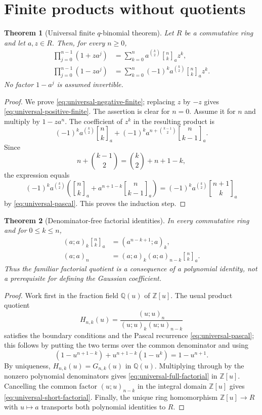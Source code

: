 \documentclass[11pt,oneside,openany]{book}
\newtheorem{theorem}{Theorem}[chapter]
\theoremstyle{definition}
\theoremstyle{remark}
\newcommand{\Qbinom}[3]{\genfrac{[}{]}{0pt}{}{#1}{#2}_{#3}}
\newcommand{\Q}{\mathbb Q}
\newcommand{\Z}{\mathbb Z}
\begin{document}
\section{Finite products without quotients}

\begin{theorem}[Universal finite $q$-binomial theorem]\label{thm:universal-finite-qbinomial}
Let $R$ be a commutative ring and let $a,z\in R$.  Then, for every $n\ge0$,
\begin{align}
 \prod_{j=0}^{n-1}(1+za^j)
 &=\sum_{k=0}^n a^{\binom{k}{2}}\Qbinom nk a z^k,\label{eq:universal-positive-finite}\\
 \prod_{j=0}^{n-1}(1-za^j)
 &=\sum_{k=0}^n(-1)^ka^{\binom{k}{2}}\Qbinom nk a z^k.\label{eq:universal-negative-finite}
\end{align}
No factor $1-a^j$ is assumed invertible.
\end{theorem}

\begin{proof}
We prove \eqref{eq:universal-negative-finite}; replacing $z$ by $-z$ gives \eqref{eq:universal-positive-finite}.  The assertion is clear for $n=0$.  Assume it for $n$ and multiply by $1-za^n$.  The coefficient of $z^k$ in the resulting product is
\[
 (-1)^ka^{\binom{k}{2}}\Qbinom nk a
 +(-1)^ka^{n+\binom{k-1}{2}}\Qbinom n{k-1}a.
\]
Since
\[
 n+\binom{k-1}{2}=\binom{k}{2}+n+1-k,
\]
the expression equals
\[
 (-1)^ka^{\binom{k}{2}}
 \left(\Qbinom nk a+a^{n+1-k}\Qbinom n{k-1}a\right)
 =(-1)^ka^{\binom{k}{2}}\Qbinom{n+1}k a
\]
by \eqref{eq:universal-pascal}.  This proves the induction step.
\end{proof}

\begin{theorem}[Denominator-free factorial identities]\label{thm:universal-factorial-identities}
In every commutative ring and for $0\le k\le n$,
\begin{align}
 (a;a)_k\Qbinom nk a&=(a^{n-k+1};a)_k,\label{eq:universal-short-factorial}\\
 (a;a)_n&=(a;a)_k(a;a)_{n-k}\Qbinom nk a.\label{eq:universal-full-factorial}
\end{align}
Thus the familiar factorial quotient is a consequence of a polynomial identity, not a prerequisite for defining the Gaussian coefficient.
\end{theorem}

\begin{proof}
Work first in the fraction field $\Q(u)$ of $\Z[u]$.  The usual product quotient
\[
 H_{n,k}(u)=\frac{(u;u)_n}{{(u;u)_k(u;u)_{n-k}}}
\]
satisfies the boundary conditions and the Pascal recurrence \eqref{eq:universal-pascal}; this follows by putting the two terms over the common denominator and using
\[
 (1-u^{n+1-k})+u^{n+1-k}(1-u^k)=1-u^{n+1}.
\]
By uniqueness, $H_{n,k}(u)=G_{n,k}(u)$ in $\Q(u)$.  Multiplying through by the nonzero polynomial denominators gives \eqref{eq:universal-full-factorial} in $\Z[u]$.  Cancelling the common factor $(u;u)_{n-k}$ in the integral domain $\Z[u]$ gives \eqref{eq:universal-short-factorial}.  Finally, the unique ring homomorphism $\Z[u]\to R$ with $u\mapsto a$ transports both polynomial identities to $R$.
\end{proof}
\end{document}
